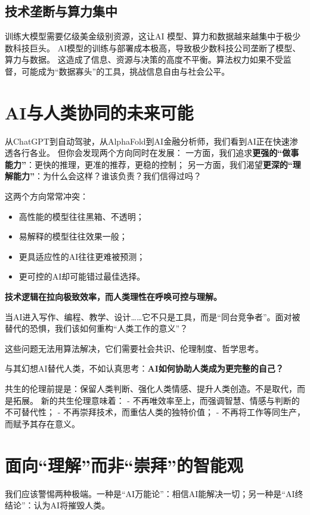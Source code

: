 \subsection*{技术垄断与算力集中}
训练大模型需要亿级美金级别资源，这让AI 模型、算力和数据越来越集中于极少数科技巨头。
AI模型的训练与部署成本极高，导致极少数科技公司垄断了模型、算力与数据。
这造成了信息、资源与决策的高度不平衡。算法权力如果不受监督，可能成为“数据寡头”的工具，挑战信息自由与社会公平。

\section{AI与人类协同的未来可能}
从ChatGPT到自动驾驶，从AlphaFold到AI金融分析师，我们看到AI正在快速渗透各行各业。
但你会发现两个方向同时在发展： 一方面，我们追求\textbf{更强的“做事能力”}：更快的推理，更准的推荐，更稳的控制；
另一方面，我们渴望\textbf{更深的“理解能力”}：为什么会这样？谁该负责？我们信得过吗？

这两个方向常常冲突：
\begin{itemize}
\item 高性能的模型往往黑箱、不透明；
\item 易解释的模型往往效果一般；
\item 更具适应性的AI往往更难被预测；
\item 更可控的AI却可能错过最佳选择。
\end{itemize}

\textbf{技术逻辑在拉向极致效率，而人类理性在呼唤可控与理解。}

当AI进入写作、编程、教学、设计……它不只是工具，而是“同台竞争者”。面对被替代的恐惧，我们该如何重构“人类工作的意义”？

这些问题无法用算法解决，它们需要社会共识、伦理制度、哲学思考。

与其幻想AI替代人类，不如认真思考：\textbf{AI如何协助人类成为更完整的自己？}

共生的伦理前提是：保留人类判断、强化人类情感、提升人类创造。不是取代，而是拓展。
新的共生伦理意味着：
- 不再唯效率至上，而强调智慧、情感与判断的不可替代性；
- 不再崇拜技术，而重估人类的独特价值；
- 不再将工作等同生产，而赋予其存在意义。



\section{面向“理解”而非“崇拜”的智能观}

我们应该警惕两种极端。一种是“AI万能论”：相信AI能解决一切；另一种是“AI终结论”：认为AI将摧毁人类。

